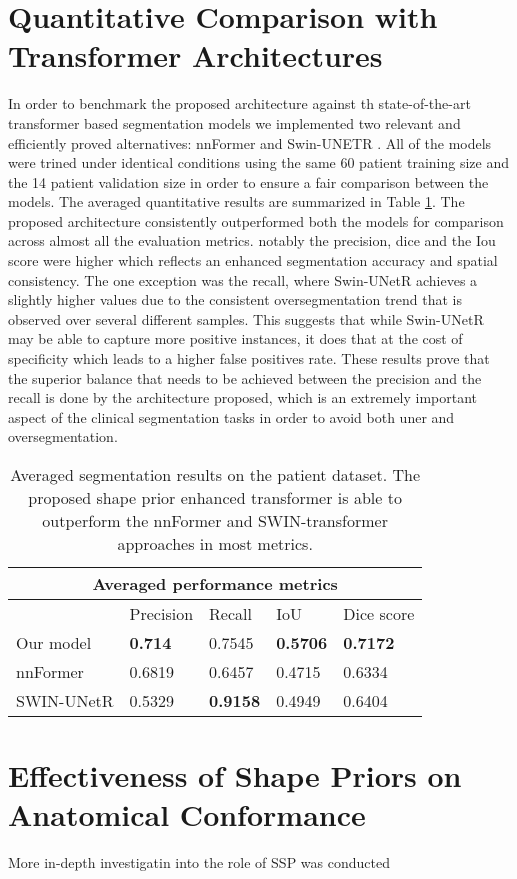 \section{Quantitative Comparison with Transformer Architectures}
In order to benchmark the proposed architecture against th state-of-the-art transformer based segmentation models we implemented two relevant and efficiently proved alternatives: nnFormer \cite{zhou2023nnformer} and Swin-UNETR \cite{10.1007/978-3-031-08999-2_22}. All of the models were trined under identical conditions using the same 60 patient training size and the 14 patient validation size in order to ensure a fair comparison between the models. The averaged quantitative results are summarized in Table \ref{tab:quantitative_comparison}. The proposed architecture consistently outperformed both the models for comparison across almost all the evaluation metrics. notably the precision, dice and the Iou score were higher which reflects an enhanced segmentation accuracy and spatial consistency. The one exception was the recall, where Swin-UNetR achieves a slightly higher values due to the consistent oversegmentation trend that is observed over several different samples. This suggests that while Swin-UNetR may be able to capture more positive instances, it does that at the cost of specificity which leads to a higher false positives rate. These results prove that the superior balance that needs to be achieved between the precision and the recall is done by the architecture proposed, which is an extremely important aspect of the clinical segmentation tasks in order to avoid both uner and oversegmentation.

\begin{table}[h!]
    \begin{tabular}{ |p{2.3cm}|p{2.3cm}|p{2.3cm}|p{2.3cm}|p{2.3cm}|}
            \hline
            \multicolumn{5}{|c|}{Averaged performance metrics} \\
            \hline
             & Precision & Recall & IoU & Dice score \\
            \hline
            Our model & \textbf{0.714} & 0.7545 & \textbf{0.5706} & \textbf{0.7172} \\
            \hline
            nnFormer & 0.6819 & 0.6457 & 0.4715 & 0.6334 \\
            \hline
            SWIN-UNetR & 0.5329 & \textbf{0.9158} & 0.4949 & 0.6404 \\
            \hline
    \end{tabular}
    \caption{Averaged segmentation results on the patient dataset. The proposed shape prior enhanced transformer is able to outperform the nnFormer \cite{zhou2023nnformer} and SWIN-transformer \cite{10.1007/978-3-031-08999-2_22} approaches in most metrics.}
    \label{tab:quantitative_comparison}
  \end{table}


\section{Effectiveness of Shape Priors on Anatomical Conformance}
More in-depth investigatin into the role of SSP was conducted 